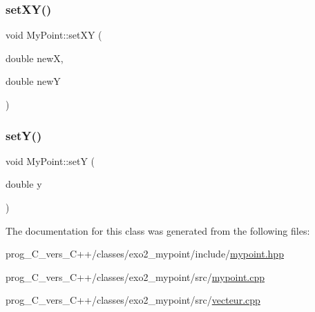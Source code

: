 \mbox{\label{classMyPoint_a2814ad77927c5f38587dfd70076c4710}} 
\subsubsection{\texorpdfstring{set\+X\+Y()}{setXY()}}
{\footnotesize\ttfamily void My\+Point\+::set\+XY (\begin{DoxyParamCaption}\item[{double}]{newX,  }\item[{double}]{newY }\end{DoxyParamCaption})\hspace{0.3cm}{\ttfamily [inline]}}

\mbox{\label{classMyPoint_aca5495247b2df8dd262e6d138de4029b}} 
\subsubsection{\texorpdfstring{set\+Y()}{setY()}}
{\footnotesize\ttfamily void My\+Point\+::setY (\begin{DoxyParamCaption}\item[{double}]{y }\end{DoxyParamCaption})\hspace{0.3cm}{\ttfamily [inline]}}



The documentation for this class was generated from the following files\+:\begin{DoxyCompactItemize}
\item 
prog\+\_\+\+C\+\_\+vers\+\_\+\+C++/classes/exo2\+\_\+mypoint/include/\hyperlink{mypoint_8hpp}{mypoint.\+hpp}\item 
prog\+\_\+\+C\+\_\+vers\+\_\+\+C++/classes/exo2\+\_\+mypoint/src/\hyperlink{mypoint_8cpp}{mypoint.\+cpp}\item 
prog\+\_\+\+C\+\_\+vers\+\_\+\+C++/classes/exo2\+\_\+mypoint/src/\hyperlink{vecteur_8cpp}{vecteur.\+cpp}\end{DoxyCompactItemize}
